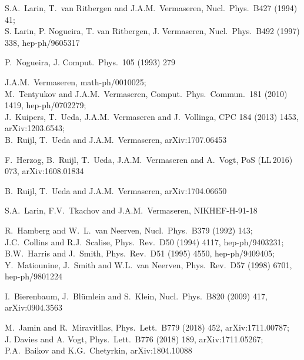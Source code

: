 \documentclass[12pt]{article}
\begin{document}
{\begin{thebibliography}{100}
S.A.~Larin, T.~van Ritbergen and J.A.M.~Vermaseren,
  Nucl.\ Phys.\ B427 (1994) 41; \\[0.2mm]
S. Larin, P. Nogueira, T. van Ritbergen, J. Vermaseren,
  Nucl.\ Phys.\ B492 (1997) 338, hep-ph/9605317

P.~Nogueira,
  J. Comput.\ Phys.\ 105 (1993) 279

J.A.M.~Vermaseren, math-ph/0010025; \\[0.2mm]
M.~Tentyukov and J.A.M.~Vermaseren,
  Comput.\ Phys.\ Commun.\  181 (2010) 1419, hep-ph/0702279; \\[0.2mm]
J.~Kuipers, T.~Ueda, J.A.M.~Vermaseren and J.~Vollinga,
  CPC 184 (2013) 1453, arXiv:1203.6543; \\[0.2mm]
B.~Ruijl, T.~Ueda and J.A.M.~Vermaseren, arXiv:1707.06453

  F.~Herzog, B.~Ruijl, T.~Ueda, J.A.M.~Vermaseren and A.~Vogt,
  PoS (LL$\,$2016) 073, arXiv:1608.01834

B.~Ruijl, T.~Ueda and J.A.M.~Vermaseren,
  arXiv:1704.06650 

S.A.~Larin, F.V.~Tkachov and J.A.M.~Vermaseren,
  NIKHEF-H-91-18

R.~Hamberg and W.~L.~van Neerven,
  Nucl.\ Phys.\ B379 (1992) 143; \\[0.2mm]
J.C.~Collins and R.J.~Scalise,
  Phys.\ Rev.\ D50 (1994) 4117, hep-ph/9403231; \\[0.2mm]
B.W.~Harris and J.~Smith,
  Phys.\ Rev.\ D51 (1995) 4550, hep-ph/9409405; \\[0.2mm]
Y.~Matiounine, J.~Smith and W.L.~van Neerven,
  Phys.\ Rev.\ D57 (1998) 6701, hep-ph/9801224

I.~Bierenbaum, J.~Bl{\"u}mlein and S.~Klein, 
  Nucl.\ Phys.\ B820 (2009) 417, arXiv:0904.3563

M.~Jamin and R.~Miravitllas,
  Phys.\ Lett.\ B779 (2018) 452, arXiv:1711.00787; \\[0.2mm]
J. Davies and A. Vogt,
  Phys.\ Lett.\ B776 (2018) 189, arXiv:1711.05267; \\[0.2mm]
P.A.~Baikov and K.G.~Chetyrkin,
  arXiv:1804.10088 


\end{thebibliography}}
\end{document}
